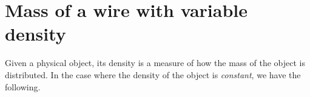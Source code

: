 \documentclass{ximera}
\begin{document}
%
%
%
%
%

\section{Mass of a wire with variable density}

Given a physical object, its density is a measure of how the mass of the object is distributed.  In the case where the density of the object is \emph{constant}, we have the following.
\end{document}
